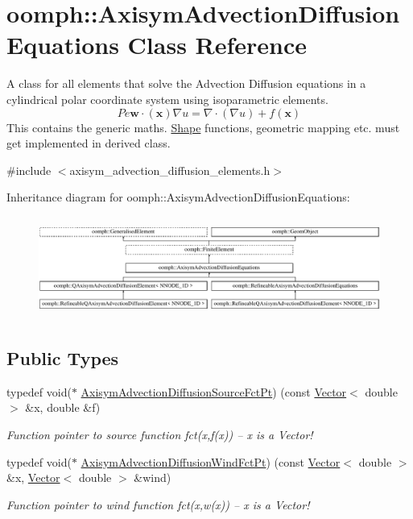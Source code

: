 \hypertarget{classoomph_1_1AxisymAdvectionDiffusionEquations}{}\section{oomph\+:\+:Axisym\+Advection\+Diffusion\+Equations Class Reference}
\label{classoomph_1_1AxisymAdvectionDiffusionEquations}


A class for all elements that solve the Advection Diffusion equations in a cylindrical polar coordinate system using isoparametric elements. \[ Pe \mathbf{w}\cdot(\mathbf{x}) \nabla u = \nabla \cdot \left( \nabla u \right) + f(\mathbf{x}) \] This contains the generic maths. \hyperlink{classoomph_1_1Shape}{Shape} functions, geometric mapping etc. must get implemented in derived class.  




{\ttfamily \#include $<$axisym\+\_\+advection\+\_\+diffusion\+\_\+elements.\+h$>$}

Inheritance diagram for oomph\+:\+:Axisym\+Advection\+Diffusion\+Equations\+:\begin{figure}[H]
\begin{center}
\leavevmode
\includegraphics[height=3.365385cm]{classoomph_1_1AxisymAdvectionDiffusionEquations}
\end{center}
\end{figure}
\subsection*{Public Types}
\begin{DoxyCompactItemize}
\item 
typedef void($\ast$ \hyperlink{classoomph_1_1AxisymAdvectionDiffusionEquations_a5110527308cbe58e90fb9ac146d172a0}{Axisym\+Advection\+Diffusion\+Source\+Fct\+Pt}) (const \hyperlink{classoomph_1_1Vector}{Vector}$<$ double $>$ \&x, double \&f)
\begin{DoxyCompactList}\small\item\em Function pointer to source function fct(x,f(x)) -- x is a Vector! \end{DoxyCompactList}\item 
typedef void($\ast$ \hyperlink{classoomph_1_1AxisymAdvectionDiffusionEquations_a53ee8d4a13b53896d66020591a8224b0}{Axisym\+Advection\+Diffusion\+Wind\+Fct\+Pt}) (const \hyperlink{classoomph_1_1Vector}{Vector}$<$ double $>$ \&x, \hyperlink{classoomph_1_1Vector}{Vector}$<$ double $>$ \&wind)
\begin{DoxyCompactList}\small\item\em Function pointer to wind function fct(x,w(x)) -- x is a Vector! \end{DoxyCompactList}\end{DoxyCompactItemize}
